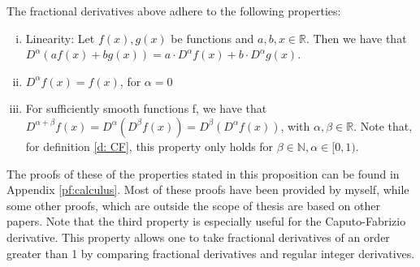\begin{proposition}\label{p: calculus}
    The fractional derivatives above adhere to the following properties:
    \begin{enumerate}[(i)]
        \item Linearity: Let \(f(x), g(x)\) be functions and \(a, b, x \in \mathbb{R}\). Then we have that \(D^{\alpha} \left(a f(x) + b g(x)\right) = a \cdot D^{\alpha} f(x) + b \cdot D^{\alpha} g(x)\).
        \item \(D^{\alpha} f(x) = f(x)\), for \(\alpha = 0\) 
        \item For sufficiently smooth functions f, we have that \(D^{\alpha + \beta} f(x) = D^\alpha(D^\beta f(x)) =  D^\beta(D^\alpha f(x))\), with \(\alpha, \beta \in \mathbb{R}\). Note that, for definition \ref{d: CF}, this property only holds for \(\beta \in \mathbb{N}, \alpha \in [0,1)\).
    \end{enumerate}
        
    
\end{proposition}

The proofs of these of the properties stated in this proposition can be found in Appendix \ref{pf:calculus}. Most of these proofs have been provided by myself, while some other proofs, which are outside the scope of thesis are based on other papers. Note that the third property is especially useful for the Caputo-Fabrizio derivative. This property allows one to take fractional derivatives of an order greater than 1 by comparing fractional derivatives and regular integer derivatives.

